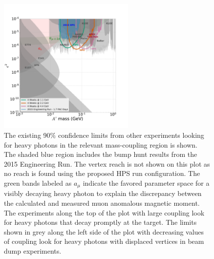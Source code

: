 \begin{figure}[htb]
  \centering
      \includegraphics[width=0.6\textwidth]{pics/intro/reach_nominal.pdf}
  \caption[Reach for the HPS experiment]{The existing 90$\%$ confidence limits from other experiments looking for heavy photons in the relevant mass-coupling region is shown. The shaded blue region includes the bump hunt results from the 2015 Engineering Run. The vertex reach is not shown on this plot as no reach is found using the proposed HPS run configuration. The green bands labeled as $a_\mu$ indicate the favored parameter space for a visibly decaying heavy photon to explain the discrepancy between the calculated and measured muon anomalous magnetic moment. The experiments along the top of the plot with large coupling look for heavy photons that decay promptly at the target. The limits shown in grey along the left side of the plot with decreasing values of coupling look for heavy photons with displaced vertices in beam dump experiments.}
  \label{Figure:projReach}
\end{figure}

